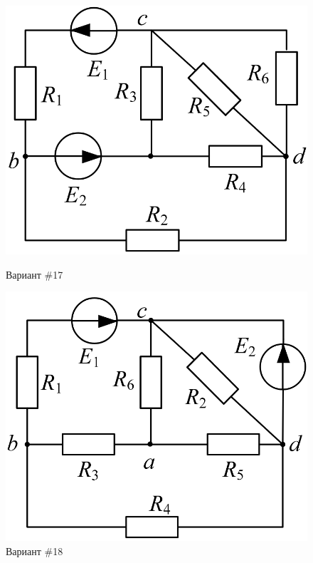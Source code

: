 \begin{figure}[H]
    \centering
    \begin{minipage}{0.48\textwidth}
        \centering
        \includegraphics[width=\textwidth]{images/17_task.png}
        \caption{Вариант \#17}
        \label{fig:task_17}
    \end{minipage}
    \hfill
    \begin{minipage}{0.48\textwidth}
        \centering
        \includegraphics[width=\textwidth]{images/18_task.png}
        \caption{Вариант \#18}
        \label{fig:task_18}
    \end{minipage}
\end{figure}

